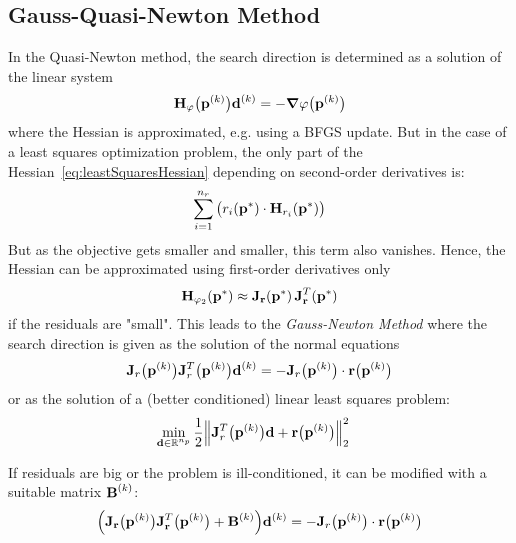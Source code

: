 		\subsection{Gauss-Quasi-Newton Method}
			In the Quasi-Newton method, the search direction is determined as a solution of the linear system
			\begin{align*}
				\boldsymbol{\mathrm{H}}_\varphi\big(\boldsymbol{\mathrm{p}}^{(k)}\big) \boldsymbol{\mathrm{d}}^{(k)} = -\grad{\varphi}\big(\boldsymbol{\mathrm{p}}^{(k)}\big)
			\end{align*}
			where the Hessian is approximated, e.g. using a BFGS update. But in the case of a least squares optimization problem, the only part of the Hessian~\eqref{eq:leastSquaresHessian} depending on second-order derivatives is:
			\begin{align*}
				\sum_{i = 1}^{n_r} \big( r_i(\boldsymbol{\mathrm{p}}^\ast) \cdot \boldsymbol{\mathrm{H}}_{r_i}(\boldsymbol{\mathrm{p}}^\ast) \big)
			\end{align*}
			But as the objective gets smaller and smaller, this term also vanishes. Hence, the Hessian can be approximated using first-order derivatives only
			\begin{align*}
				\boldsymbol{\mathrm{H}}_{\varphi_2}(\boldsymbol{\mathrm{p}}^\ast) \approx \boldsymbol{\mathrm{J}}_{\boldsymbol{\mathrm{r}}}(\boldsymbol{\mathrm{p}}^\ast) \, \boldsymbol{\mathrm{J}}_{\boldsymbol{\mathrm{r}}}^T(\boldsymbol{\mathrm{p}}^\ast)
			\end{align*}
			if the residuals are "small". This leads to the \emph{Gauss-Newton Method} where the search direction is given as the solution of the normal equations
			\begin{align*}
				\boldsymbol{\mathrm{J}}_r\big(\boldsymbol{\mathrm{p}}^{(k)}\big) \boldsymbol{\mathrm{J}}_r^T\big(\boldsymbol{\mathrm{p}}^{(k)}\big) \boldsymbol{\mathrm{d}}^{(k)} = -\boldsymbol{\mathrm{J}}_r\big(\boldsymbol{\mathrm{p}}^{(k)}\big) \cdot \boldsymbol{\mathrm{r}}\big(\boldsymbol{\mathrm{p}}^{(k)}\big)
			\end{align*}
			or as the solution of a (better conditioned) linear least squares problem:
			\begin{align*}
				\min_{\boldsymbol{\mathrm{d}} \in \mathbb{R}^{n_p}} &\, \frac{1}{2} \Big\lVert \boldsymbol{\mathrm{J}}_r^T\big(\boldsymbol{\mathrm{p}}^{(k)}\big) \boldsymbol{\mathrm{d}} + \boldsymbol{\mathrm{r}}\big(\boldsymbol{\mathrm{p}}^{(k)}\big) \Big\rVert_2^2
			\end{align*}
			
			If residuals are big or the problem is ill-conditioned, it can be modified with a suitable matrix \( \boldsymbol{\mathrm{B}}^{(k)} \):
			\begin{align*}
				\Big( \boldsymbol{\mathrm{J}}_{\boldsymbol{\mathrm{r}}}\big(\boldsymbol{\mathrm{p}}^{(k)}\big) \boldsymbol{\mathrm{J}}_{\boldsymbol{\mathrm{r}}}^T\big(\boldsymbol{\mathrm{p}}^{(k)}\big) + \boldsymbol{\mathrm{B}}^{(k)} \Big) \boldsymbol{\mathrm{d}}^{(k)} = -\boldsymbol{\mathrm{J}}_r\big(\boldsymbol{\mathrm{p}}^{(k)}\big) \cdot \boldsymbol{\mathrm{r}}\big(\boldsymbol{\mathrm{p}}^{(k)}\big)
			\end{align*}
			
